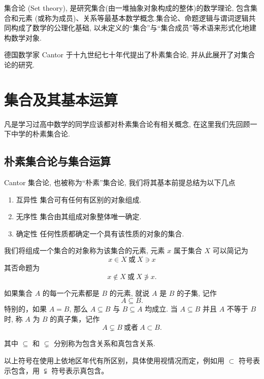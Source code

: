 \documentclass[cn,toc=twocol]{elegantbook}
\newcommand{\ITEMS}{\begin{enumerate}}
\newcommand{\ITEME}{\end{enumerate}}
\begin{document}
集合论 (Set theory), 是研究集合(由一堆抽象对象构成的整体)的数学理论, 包含集合和元素 (或称为成员)、关系等最基本数学概念.集合论、命题逻辑与谓词逻辑共同构成了数学的公理化基础, 以未定义的“集合”与“集合成员”等术语来形式化地建构数学对象.

德国数学家 Cantor 于十九世纪七十年代提出了朴素集合论, 并从此展开了对集合论的研究.

\section{集合及其基本运算}

凡是学习过高中数学的同学应该都对朴素集合论有相关概念, 在这里我们先回顾一下中学的朴素集合论.

\subsection{朴素集合论与集合运算}

Cantor 集合论, 也被称为“朴素”集合论, 我们将其基本前提总结为以下几点

\ITEMS
	\item 互异性 \quad 集合可有任何有区别的对象组成.
	\item 无序性 \quad 集合由其组成对象整体唯一确定.
	\item 确定性 \quad 任何性质都确定一个具有该性质的对象的集合.
\ITEME


我们将组成一个集合的对象称为该集合的元素, 元素 $x$ 属于集合 $X$ 可以简记为
\[
	x\in X\ \mbox{或}\ X\ni x 
\]
其否命题为
\[
	x\notin X\ \mbox{或}\ X \not\ni x.
\]

如果集合 $A$ 的每一个元素都是 $B$ 的元素, 就说 $A$ 是 $B$ 的子集, 记作
\[
A \subseteq B.
\]
特别的，如果 $A = B$, 那么 $A \subseteq B$ 与 $B \subseteq A$ 均成立. 当 $A \subseteq B$ 并且 $A$ 不等于 $B$ 时, 称 $A$ 为 $B$ 的真子集，记作
\[
	A\subsetneq B \ \text{或者}\ A \subset B.
\]

其中 $\subseteq$ 和 $\subsetneq$ 分别称为包含关系和真包含关系.

\begin{remark}
	以上符号在使用上依地区年代有所区别，具体使用视情况而定，例如用 $\subset$ 符号表示包含，用 $\subsetneqq$ 符号表示真包含。
\end{remark}
\end{document}
